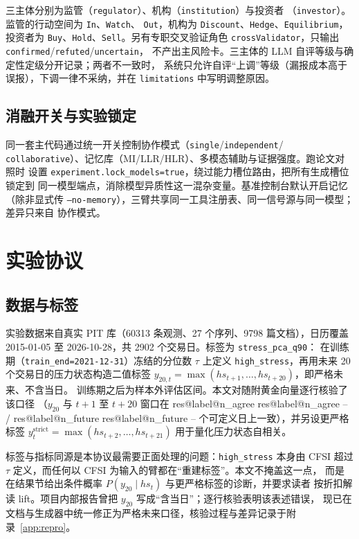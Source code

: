 \documentclass[UTF8,fontset=fandol,11pt,a4paper]{ctexart}
\makeatletter
\newcommand{\RESULT}[2]{%
  \ifcsname res@#1@#2\endcsname
    \csname res@#1@#2\endcsname
  \else
    --%
  \fi}
\makeatother
\begin{document}
三主体分别为监管（\texttt{regulator}）、机构（\texttt{institution}）与投资者
（\texttt{investor}）。监管的行动空间为 \texttt{In}、\texttt{Watch}、
\texttt{Out}，机构为 \texttt{Discount}、\texttt{Hedge}、\texttt{Equilibrium}，
投资者为 \texttt{Buy}、\texttt{Hold}、\texttt{Sell}。另有专职交叉验证角色
\texttt{crossValidator}，只输出 \texttt{confirmed}/\texttt{refuted}/\texttt{uncertain}，
不产出主风险卡。三主体的 LLM 自评等级与确定性定级分开记录；两者不一致时，
系统只允许自评“上调”等级（漏报成本高于误报），下调一律不采纳，并在
\texttt{limitations} 中写明调整原因。

\subsection{消融开关与实验锁定}

同一套主代码通过统一开关控制协作模式（\texttt{single}/\texttt{independent}/
\texttt{collaborative}）、记忆库（MI/LLR/HLR）、多模态辅助与证据强度。跑论文对照时
设置 \texttt{experiment.lock\_models=true}，绕过能力槽位路由，把所有生成槽位锁定到
同一模型端点，消除模型异质性这一混杂变量。基准控制台默认开启记忆（除非显式传
\texttt{--no-memory}），三臂共享同一工具注册表、同一信号源与同一模型；差异只来自
协作模式。

\section{实验协议}
\label{sec:protocol}

\subsection{数据与标签}

实验数据来自真实 PIT 库（60313 条观测、27 个序列、9798 篇文档），日历覆盖
2015-01-05 至 2026-10-28，共 2902 个交易日。标签为 \texttt{stress\_pca\_q90}：
在训练期（\texttt{train\_end=2021-12-31}）冻结的分位数 $\tau$ 上定义
\texttt{high\_stress}，再用未来 20 个交易日的压力状态构造二值标签
$y_{20,t}=\max(hs_{t+1},\dots,hs_{t+20})$，即严格未来、不含当日。
训练期之后为样本外评估区间。本文对随附黄金向量逐行核验了该口径
（$y_{20}$ 与 $t+1$ 至 $t+20$ 窗口在 \RESULT{label}{n_agree}/
\RESULT{label}{n_future} 个可定义日上一致），并另设更严格标签
$y^{\mathrm{strict}}_{t}=\max(hs_{t+2},\dots,hs_{t+21})$ 用于量化压力状态自相关。

标签与指标同源是本协议最需要正面处理的问题：\texttt{high\_stress} 本身由 CFSI
超过 $\tau$ 定义，而任何以 CFSI 为输入的臂都在“重建标签”。本文不掩盖这一点，
而是在结果节给出条件概率 $P(y_{20}\mid hs_t)$ 与更严格标签的诊断，并要求读者
按折扣解读 lift。项目内部报告曾把 $y_{20}$ 写成“含当日”；逐行核验表明该表述错误，
现已在文档与生成器中统一修正为严格未来口径，核验过程与差异记录于附录~\ref{app:repro}。
\end{document}
